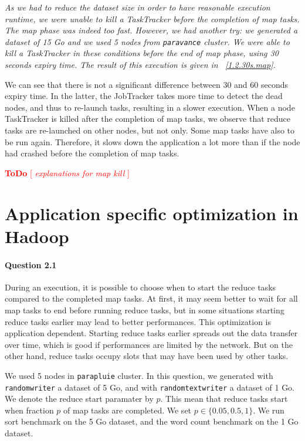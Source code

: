 \documentclass[a4paper]{article}
\newcommand{\todo}[1]{\textcolor{red}{\textbf{ToDo} [ \emph{#1} ]}}
\begin{document}
\textit{As we had to reduce the dataset size in order to have reasonable execution runtime,
we were unable to kill a TaskTracker before the completion of map tasks.
The map phase was indeed too fast.
However, we had another try: we generated a dataset of 15 Go and we used 5 nodes from \texttt{paravance} cluster.
We were able to kill a TaskTracker in these conditions before the end of map phase, using 30 seconds expiry time.
The result of this execution is given in \figurename~\ref{1.2.30s.map}.}

We can see that there is not a significant difference between 30 and 60 seconds expiry time.
In the latter, the JobTracker takes more time to detect the dead nodes, and thus to re-launch tasks, resulting in a slower execution.
When a node TaskTracker is killed after the completion of map tasks,
we observe that reduce tasks are re-launched on other nodes, but not only.
Some map tasks have also to be run again.
Therefore, it slows down the application a lot more than if the node had crashed before the completion of map tasks.

\todo{ explanations for map kill }


\section{Application specific optimization in Hadoop}

\paragraph{Question 2.1}

During an execution, it is possible to choose when to start the reduce tasks compared to the completed map tasks.
At first, it may seem better to wait for all map tasks to end before running reduce tasks,
but in some situations starting reduce tasks earlier may lead to better performances.
This optimization is application dependent.
Starting reduce tasks earlier spreads out the data transfer over time, which is good if performances are limited by the network.
But on the other hand, reduce tasks occupy slots that may have been used by other tasks.

We used 5 nodes in \texttt{parapluie} cluster.
In this question, we generated with \texttt{randomwriter} a dataset of 5 Go, and with \texttt{randomtextwriter} a dataset of 1 Go.
We denote the reduce start paramater by $p$.
This mean that reduce tasks start when fraction $p$ of map tasks are completed.
We set $p \in \lbrace 0.05, 0.5, 1 \rbrace$.
We run sort benchmark on the 5 Go dataset, and the word count benchmark on the 1 Go dataset.
\end{document}
